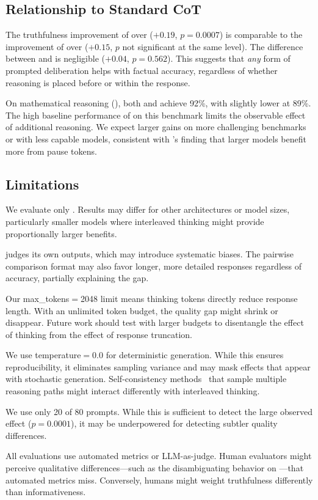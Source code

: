 \subsection{Relationship to Standard CoT}

The truthfulness improvement of \sentthink over \direct ($+0.19$, $p{=}0.0007$) is comparable to the improvement of \stdcot over \direct ($+0.15$, $p$ not significant at the same level). The difference between \sentthink and \stdcot is negligible ($+0.04$, $p{=}0.562$). This suggests that \emph{any} form of prompted deliberation helps with factual accuracy, regardless of whether reasoning is placed before or within the response.

On mathematical reasoning (\gsm), both \sentthink and \direct achieve 92\%, with \stdcot slightly lower at 89\%. The high baseline performance of \gptfour on this benchmark limits the observable effect of additional reasoning. We expect larger gains on more challenging benchmarks or with less capable models, consistent with \citet{goyal2023think}'s finding that larger models benefit more from pause tokens.

\subsection{Limitations}
\label{sec:limitations}

 We evaluate only \gptfour. Results may differ for other architectures or model sizes, particularly smaller models where interleaved thinking might provide proportionally larger benefits.

 \gptfour judges its own outputs, which may introduce systematic biases. The pairwise comparison format may also favor longer, more detailed responses regardless of accuracy, partially explaining the \mtbench gap.

 Our max\_tokens$=$2048 limit means thinking tokens directly reduce response length. With an unlimited token budget, the \mtbench quality gap might shrink or disappear. Future work should test with larger budgets to disentangle the effect of thinking from the effect of response truncation.

 We use temperature$=$0.0 for deterministic generation. While this ensures reproducibility, it eliminates sampling variance and may mask effects that appear with stochastic generation. Self-consistency methods~\cite{wang2022selfconsistency} that sample multiple reasoning paths might interact differently with interleaved thinking.

 We use only 20 of 80 \mtbench prompts. While this is sufficient to detect the large observed effect ($p{=}0.0001$), it may be underpowered for detecting subtler quality differences.

 All evaluations use automated metrics or LLM-as-judge. Human evaluators might perceive qualitative differences---such as the disambiguating behavior on \tqa---that automated metrics miss. Conversely, humans might weight truthfulness differently than informativeness.
